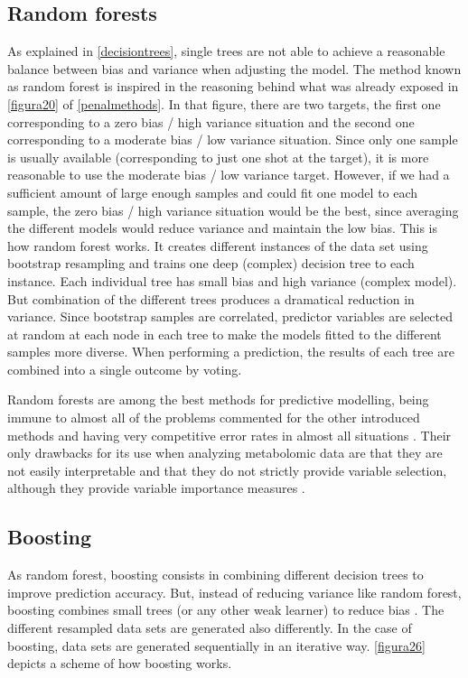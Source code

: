 \subsection{Random forests}
As explained in \autoref{decisiontrees}, single trees are not able to achieve a reasonable balance between bias and variance when adjusting the model. The method known as random forest \parencite{breiman2001random} is inspired in the reasoning behind what was already exposed in \autoref{figura20} of \autoref{penalmethods}. In that figure, there are two targets, the first one corresponding to a zero bias / high variance situation and the second one corresponding to a moderate bias / low variance situation. Since only one sample is usually available (corresponding to just one shot at the target), it is more reasonable to use the moderate bias / low variance target. However, if we had a sufficient amount of large enough samples and could fit one model to each sample, the zero bias / high variance situation would be the best, since averaging the different models would reduce variance and maintain the low bias. This is how random forest works. It creates different instances of the data set using bootstrap resampling \parencite{efron1994introduction} and trains one deep (complex) decision tree to each instance. Each individual tree has small bias and high variance (complex model). But combination of the different trees produces a dramatical reduction in variance. Since bootstrap samples are correlated, predictor variables are selected at random at each node in each tree to make the models fitted to the different samples more diverse. When performing a prediction, the results of each tree are combined into a single outcome by voting. 

Random forests are among the best methods for predictive modelling, being immune to almost all of the problems commented for the other introduced methods and having very competitive error rates in almost all situations \parencite{fernandez2014we}. Their only drawbacks for its use when analyzing metabolomic data are that they are not easily interpretable and that they do not strictly provide variable selection, although they provide variable importance measures \parencite{archer2008empirical}.

\subsection{Boosting}
As random forest, boosting consists in combining different decision trees to improve prediction accuracy. But, instead of reducing variance like random forest, boosting combines small trees (or any other weak learner) to reduce bias \parencite{freund1996experiments}. The different resampled data sets are generated also differently. In the case of boosting, data sets are generated sequentially in an iterative way. \autoref{figura26} depicts a scheme of how boosting works.

